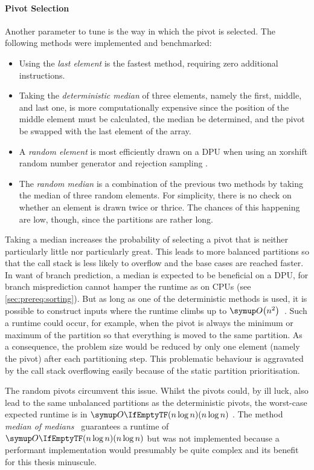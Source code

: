 \paragraph{Pivot Selection}
Another parameter to tune is the way in which the pivot is selected.
The following methods were implemented and benchmarked:
\begin{itemize}
	\item
	Using the \emph{last element} is the fastest method, requiring zero additional instructions.

	\item
	Taking the \emph{deterministic median} of three elements, namely the first, middle, and last one, is more computationally expensive since the position of the middle element must be calculated, the median be determined, and the pivot be swapped with the last element of the array.

	\item
	A \emph{random element} is most efficiently drawn on a \ac{DPU} when using an xorshift random number generator and rejection sampling \cite{lukas_geis}.

	\item
	The \emph{random median} is a combination of the previous two methods by taking the median of three random elements.
	For simplicity, there is no check on whether an element is drawn twice or thrice.
	The chances of this happening are low, though, since the partitions are rather long.
\end{itemize}
Taking a median increases the probability of selecting a pivot that is neither particularly little nor particularly great.
This leads to more balanced partitions so that the call stack is less likely to overflow and the base cases are reached faster.
In want of branch prediction, a median is expected to be beneficial on a \ac{DPU}, for branch misprediction cannot hamper the runtime as on \acp{CPU} (see \cref{sec:prereq:sorting}).
But as long as one of the deterministic methods is used, it is possible to construct inputs where the runtime climbs up to \(\bigoh*{n^2}\)~\cite{erkiö1984worstcase}.
Such a runtime could occur, for example, when the pivot is always the minimum or maximum of the partition so that everything is moved to the same partition.
As a consequence, the problem size would be reduced by only one element (namely the pivot) after each partitioning step.
This problematic behaviour is aggravated by the call stack overflowing easily because of the static partition prioritisation.

The random pivots circumvent this issue.
Whilst the pivots could, by ill luck, also lead to the same unbalanced partitions as the deterministic pivots, the worst-case expected runtime is in \(\bigoh{n \log n}\) \cite{blum2011probabilistic}.
The method \emph{median of medians}~\cite{blum1973median} guarantees a runtime of \(\bigoh{n \log n}\) but was not implemented because a performant implementation would presumably be quite complex and its benefit for this thesis minuscule.
